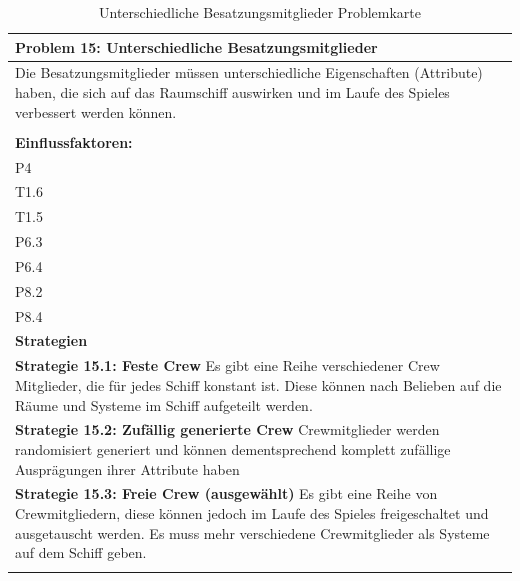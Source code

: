 \documentclass[fontsize=12pt,paper=a4,twoside]{scrartcl}
\begin{document}
\begin{table}[H]
    \centering
    \begin{tabular}{|p{15cm}|}
    \hline
          \textbf{Problem 15: Unterschiedliche Besatzungsmitglieder}  \\ \hline
	Die Besatzungsmitglieder müssen unterschiedliche Eigenschaften (Attribute) haben, die sich auf das Raumschiff auswirken und im Laufe des Spieles verbessert werden können. \\
         \\ \hline
          \textbf{Einflussfaktoren: } \\
	P4 \\
	T1.6 \\
	T1.5 \\
	P6.3 \\
	P6.4 \\
	P8.2 \\
	P8.4 \\
          \hline
          \textbf{Strategien} \\ \hline
            {}          
           \label{strategie:15.1}     
          \textbf{Strategie 15.1: Feste Crew} Es gibt eine Reihe verschiedener Crew Mitglieder, die für jedes Schiff konstant ist. Diese können nach Belieben auf die Räume und Systeme im Schiff aufgeteilt werden. \\        
  {}          
           \label{strategie:15.2}              
          \textbf{Strategie 15.2: Zufällig generierte Crew} Crewmitglieder werden randomisiert generiert und können dementsprechend komplett zufällige Ausprägungen ihrer Attribute haben  \\
	 {}          
           \label{strategie:15.3}     
          \textbf{Strategie 15.3: Freie Crew (ausgewählt)} Es gibt eine Reihe von Crewmitgliedern, diese können jedoch im Laufe des Spieles freigeschaltet und ausgetauscht werden. Es muss mehr verschiedene Crewmitglieder als Systeme auf dem Schiff geben. \\ 
	 \\ \hline
    \end{tabular}

    \caption{Unterschiedliche Besatzungsmitglieder Problemkarte}
    \label{tab:ProblemKarte15}
\end{table}
\end{document}
